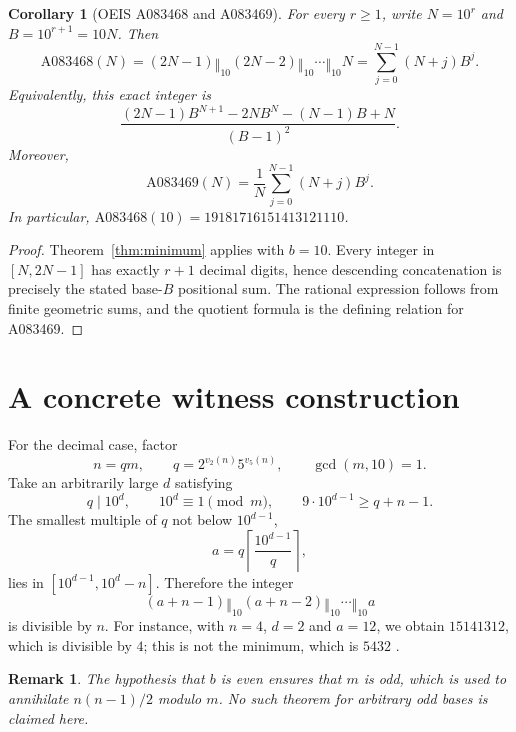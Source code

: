 \documentclass[11pt]{article}
\newtheorem{corollary}{Corollary}
\newtheorem{remark}{Remark}
\newcommand{\cat}{\mathbin{\Vert}}
\begin{document}
\begin{corollary}[OEIS A083468 and A083469]\label{cor:minimum}
For every $r\ge1$, write $N=10^r$ and $B=10^{r+1}=10N$. Then
\[
\boxed{\mathrm{A083468}(N)
=(2N-1)\cat_{10}(2N-2)\cat_{10}\cdots\cat_{10}N
=\sum_{j=0}^{N-1}(N+j)B^j.}
\]
Equivalently, this exact integer is
\[
\frac{(2N-1)B^{N+1}-2NB^N-(N-1)B+N}{(B-1)^2}.
\]
Moreover,
\[
\boxed{\mathrm{A083469}(N)=\frac1N\sum_{j=0}^{N-1}(N+j)B^j.}
\]
In particular, $\mathrm{A083468}(10)=19181716151413121110$.
\end{corollary}
\begin{proof}
Theorem~\ref{thm:minimum} applies with $b=10$. Every integer
in $[N,2N-1]$ has exactly $r+1$ decimal digits, hence descending
concatenation is precisely the stated base-$B$ positional sum.
The rational expression follows from finite geometric sums, and
the quotient formula is the defining relation for A083469.
\end{proof}

\section{A concrete witness construction}
For the decimal case, factor
\[
 n=q m,\qquad q=2^{v_2(n)}5^{v_5(n)},\qquad \gcd(m,10)=1.
\]
Take an arbitrarily large $d$ satisfying
\[
 q\mid10^d,\qquad10^d\equiv1\pmod m,\qquad
 9\cdot10^{d-1}\ge q+n-1.
\]
The smallest multiple of $q$ not below $10^{d-1}$,
\[
 a=q\left\lceil\frac{10^{d-1}}q\right\rceil,
\]
lies in $[10^{d-1},10^d-n]$. Therefore the integer
\[
 (a+n-1)\cat_{10}(a+n-2)\cat_{10}\cdots\cat_{10}a
\]
is divisible by $n$. For instance, with $n=4$, $d=2$ and $a=12$,
we obtain $15141312$, which is divisible by $4$; this is not the
minimum, which is $5432$ \cite{oeis468}.
\begin{remark}
The hypothesis that $b$ is even ensures that $m$ is odd, which is
used to annihilate $n(n-1)/2$ modulo $m$. No such theorem for arbitrary
odd bases is claimed here.
\end{remark}
\end{document}
